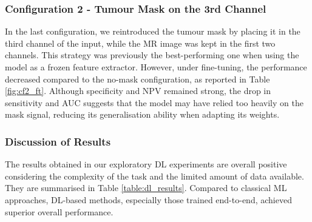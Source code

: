 \documentclass[12pt, a4paper]{report}
\begin{document}
\begin{table}[H]
\centering
{}
\caption{Configuration 1 - No Tumour Mask} 
\label{fig:cf1_ft}
\end{table}


\subsubsection{Configuration 2 - Tumour Mask on the 3rd Channel}
In the last configuration, we reintroduced the tumour mask by placing it in the third channel of the input, while the MR image was kept in the first two channels. This strategy was previously the best-performing one when using the model as a frozen feature extractor. However, under fine-tuning, the performance decreased compared to the no-mask configuration, as reported in Table \ref{fig:cf2_ft}. Although specificity and NPV remained strong, the drop in sensitivity and AUC suggests that the model may have relied too heavily on the mask signal, reducing its generalisation ability when adapting its weights.

\begin{table}[H]
\centering
{}
\caption{Configuration 2 - Tumour Mask on the 3rd Channel} 
\label{fig:cf2_ft}
\end{table}


\subsubsection{Discussion of Results}

The results obtained in our exploratory DL experiments are overall positive considering the complexity of the task and the limited amount of data available. They are summarised in Table \ref{table:dl_results}. Compared to classical ML approaches, DL-based methods, especially those trained end-to-end, achieved superior overall performance.
\end{document}
